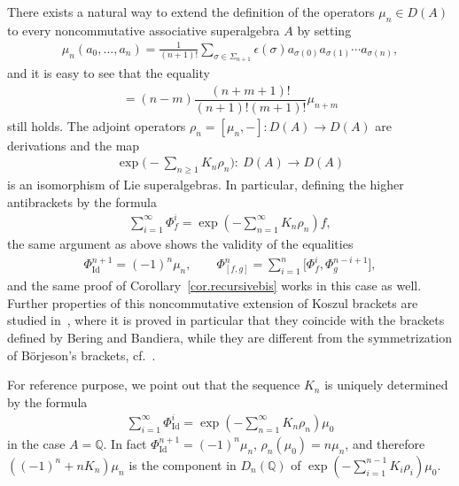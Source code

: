 \documentclass[pdftex]{sigma}
\newcommand{\Q}{\mathbb{Q}}
\numberwithin{equation}{section}
\begin{document}
\begin{Remark}\label{rem.noncommutative} There exists a natural way to extend the def\/inition of the operators $\mu_n\in D(A)$ to every noncommutative associative superalgebra $A$ by setting
\begin{gather*} \mu_n(a_0,\ldots,a_n)=\frac{1}{(n+1)!}\sum_{\sigma\in \Sigma_{n+1}}\epsilon(\sigma)
a_{\sigma(0)}a_{\sigma(1)}\cdots a_{\sigma(n)} ,\end{gather*}
and it is easy to see that the equality
\begin{gather*}[\mu_n,\mu_m]=(n-m)\dfrac{(n+m+1)!}{(n+1)!(m+1)!}
\mu_{n+m}\end{gather*}
still holds. The adjoint operators $\rho_n=[\mu_n,-]\colon D(A)\to D(A)$ are derivations and the map
\begin{gather*}\exp\bigg({-}\sum_{n\ge 1}K_n\rho_n\bigg)\colon \ D(A)\to D(A)\end{gather*}
is an isomorphism of Lie superalgebras. In particular, def\/ining the higher antibrackets by the formula
\begin{gather*} \sum_{i=1}^{\infty}\Phi_f^i=\exp\left(-\sum_{n=1}^{\infty}K_n\rho_n\right)f,\end{gather*}
the same argument as above shows the validity of the equalities
\begin{gather*} \Phi_{\operatorname{Id}}^{n+1}=(-1)^n\mu_n,\qquad \Phi_{[f,g]}^{n}=\sum_{i=1}^n\big[\Phi^i_f,\Phi^{n-i+1}_g\big],\end{gather*}
and the same proof of Corollary~\ref{cor.recursivebis} works in this case as well. Further properties of this noncommutative extension of Koszul brackets are studied in~\cite{intrinsic}, where it is proved in particular that they coincide with the brackets def\/ined by Bering and Bandiera, while they are dif\/ferent from the symmetrization of B\"{o}rjeson's brackets, cf.~\cite{markl1}.
\end{Remark}

\begin{Remark} For reference purpose, we point out that the sequence $K_n$ is uniquely determined by the formula
\begin{gather*} \sum_{i=1}^{\infty}\Phi_{\operatorname{Id}}^i=\exp\left(-\sum_{n=1}^{\infty}K_n\rho_n\right)\mu_0\end{gather*}
in the case $A=\Q$. In fact $\Phi^{n+1}_{\operatorname{Id}}=(-1)^{n}\mu_{n}$, $\rho_{n}(\mu_0)=n\mu_n$, and
therefore $((-1)^n+nK_n)\mu_n$ is the component in $D_n(\Q)$ of $\exp\left(-\sum\limits_{i=1}^{n-1}K_i\rho_i\right)\mu_0$.
\end{Remark}
\end{document}
